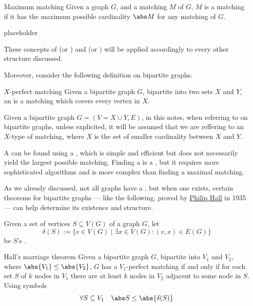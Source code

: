\documentclass[a4paper, 12pt]{report}
\begin{document}
    \begin{frameddefn}{Maximum matching}
        Given a graph $G$, and a matching $M$ of $G$, $M$ is a  matching if it has the maximum possible cardinality $\abs M$ for any matching of $G$.
    \end{frameddefn}

    \begin{example}
        placeholder 
    \end{example}

    These concepts of  (or ) and  (or ) will be applied accordingly to every other structure discussed.

    Moreover, consider the following definition on bipartite graphs.

    \begin{frameddefn}{$X$-perfect matching}
        Given a bipartite graph $G$, bipartite into two sets $X$ and $Y$, an  is a matching which covers every vertex in $X$.
    \end{frameddefn}

    Given a bipartite graph $G=(V = X \cup Y, E)$, in this notes, when referring to  on bipartite graphs, unless explicited, it will be assumed that we are reffering to an $X$-type of matching, where $X$ is the set of smaller cardinality between $X$ and $Y$.

    A  can be found using a , which is simple and efficient but does not necessarily yield the largest possible matching. Finding a  is a , but it requires more sophisticated algorithms and is more complex than finding a maximal matching.

    As we already discussed, not all graphs have a , but when one exists, certain theorems for bipartite graphs --- like the following, proved by \href{https://en.wikipedia.org/wiki/Philip_Hall}{Philip Hall} in 1935 --- can help determine its existence and structure.

    Given a set of vertices $S \subseteq V(G)$ of a graph $G$, let $$\delta(S) := \{v \in V(G) \mid \exists x \in V(G) : (v, x) \in E(G)\}$$ be $S$'s .

    \begin{framedthm}{Hall's marriage theorem}
        Given a bipartite graph $G$, bipartite into $V_1$ and $V_2$, where $\abs{V_1} \le \abs{V_2}$, $G$ has a $V_1$-perfect matching if and only if for each set $S$ of $k$ nodes in $V_1$ there are at least $k$ nodes in $V_2$ adjacent to some node in $S$. Using symbols $$\forall S \subseteq V_1 \quad \abs S \le \abs{\delta(S)}$$
    \end{framedthm}
\end{document}
